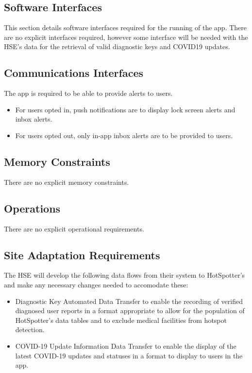 \documentclass{scrreprt}
\begin{document}
\subsection{Software Interfaces}\label{SoftInterface}
This section details software interfaces required for the running of the app. There are no explicit interfaces required, however some interface will be needed with the HSE's data for the retrieval of valid diagnostic keys and COVID19 updates.

\subsection{Communications Interfaces}\label{CommsInterface}
The app is required to be able to provide alerts to users.
\begin{itemize}
	\item For users opted in, push notifications are to display lock screen alerts and inbox alerts.
	\item For users opted out, only in-app inbox alerts are to be provided to users.
\end{itemize}

\subsection{Memory Constraints}\label{MemoryConstraints}
There are no explicit memory constraints.

\subsection{Operations}
There are no explicit operational requirements.


\subsection{Site Adaptation Requirements}
The HSE will develop the following data flows from their system to HotSpotter's and make any necessary changes needed to accomodate these:
\begin{itemize}
	\item Diagnostic Key Automated Data Transfer to enable the recording of verified diagnosed user reports in a format appropriate to allow for the population of HotSpotter's data tables and to exclude medical facilities from hotspot detection.
	\item COVID-19 Update Information Data Transfer to enable the display of the latest COVID-19 updates and statuses in a format to display to users in the app.
\end{itemize}
\end{document}
